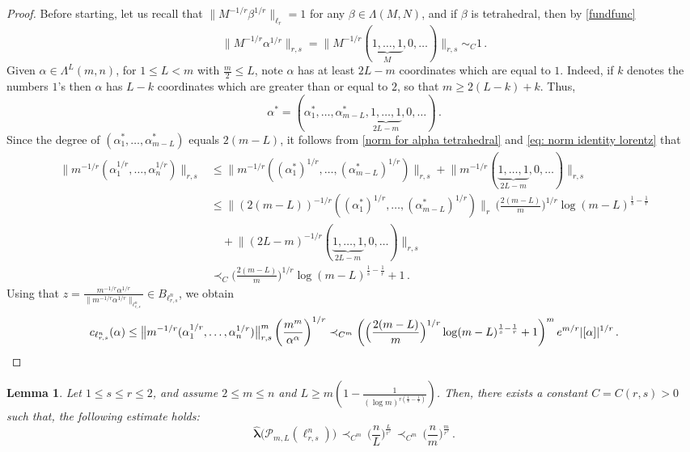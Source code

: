 \documentclass[12pt]{amsart}
\numberwithin{subsection}{section}
\newtheorem{lemma}[theorem]{Lemma}
\theoremstyle{definition}
\theoremstyle{remark}
\begin{document}
\begin{proof}
Before starting, let us recall that $\|M^{-1/r}\beta^{1/r}\|_{\ell_r}=1$ for any $\beta\in\Lambda(M,N)$, and if $\beta$
is tetrahedral, then by \eqref{fundfunc}
\begin{equation}\label{norm for alpha tetrahedral}
\big\|M^{-1/r}\alpha^{1/r}\big\|_{r,s} = \big\|M^{-1/r}(\underbrace{1,\dots,1}_{M},0,\dots)\big\|_{r,s}\sim_C 1\,.
\end{equation}
Given $\alpha  \in \Lambda^{L}(m,n)$, for $1 \le L < m$ with $\frac{m}{2} \leq L$, note $\alpha$ has at least $2L-m$ coordinates which are equal to $1$. Indeed, if  $k$ denotes the numbers  $1$'s then $\alpha$ has $L-k$ coordinates which are greater than or equal to $2$, so that $m\ge  2(L-k)+k$. Thus,
\[
\alpha^*=(\alpha_1^*,\dots,\alpha_{m-L}^*,\underbrace{1,\dots,1}_{2L-m},0,\dots)\,.
\]
Since the degree of $(\alpha_1^*,\dots,\alpha_{m-L}^*)$
equals $2(m-L)$, it follows from \eqref{norm for alpha tetrahedral} and \eqref{eq: norm identity lorentz} that
\begin{align*}
\nonumber \big\|m^{-1/r}(\alpha_1^{1/r},\dots,\alpha_n^{1/r})\big\|_{r,s} &\le  \big\|m^{-1/r}((\alpha_1^*)^{1/r},\dots,(\alpha_{m-L}^*)^{1/r})\big\|_{r,s}+
\big\|m^{-1/r}(\underbrace{1,\dots,1}_{2L-m},0,\dots)\big\|_{r,s}\\
\nonumber
&\le \big\|(2(m-L))^{-1/r}((\alpha_1^*)^{1/r},\dots,(\alpha_{m-L}^*)^{1/r})\big\|_{r} \, \Big(\frac{2(m-L)}{m}\Big)^{1/r}\log(m-L)^{\frac1{s}-\frac1{r}}
\\
&
\quad +\big\|(2L-m)^{-1/r}(\underbrace{1,\dots,1}_{2L-m},0,\dots)\big\|_{r,s} \nonumber \\
&\prec_C \Big(\frac{2(m-L)}{m}\Big)^{1/r}\log(m-L)^{\frac1{s}-\frac1{r}}+1\,.
\end{align*}
Using that  $z = \frac{m^{-1/r}\alpha^{1/r}}{\| m^{-1/r}\alpha^{1/r} \|_{\ell_{r,s}^n}} \in B_{\ell_{r,s}^n}$, we obtain
\begin{equation*}\label{eq: bound for coord fun}
c_{\ell_{r,s}^n}(\alpha)  \le {\big\|m^{-1/r}(\alpha_1^{1/r},\dots,\alpha_n^{1/r})\big\|_{r,s}^{m}}
\left( \frac{m^{m}}{\alpha^\alpha} \right)^{1/r}
 \prec_{C^m} \left( \Big(\frac{2(m-L)}{m}\Big)^{1/r}\log(m-L)^{\frac1{s}-\frac1{r}}+1 \right)^m e^{m/r} |[\alpha]|^{1/r}\,.
 \qedhere
\end{equation*}
\end{proof}

\smallskip

\begin{lemma}\label{lem: bound for big L}
Let $1 \leq s \leq r \leq 2$, and assume $2\le m\le n$  and $L\ge  m\left(1-\frac{1}{(\log m)^{r(\frac1{s}-\frac1{r})}}\right)$.
Then, there exists a constant $C=C(r,s)>0$ such that, the following estimate holds{\rm:}
\begin{equation*}%
\widehat{\boldsymbol{\lambda}}\big(\mathcal P_{m,L}(\ell_{r,s}^n)\big)
\, \prec_{C^m} \,  \Big(\frac{n}{L}\Big)^{\frac{L}{r'}} \, \prec_{C^m} \, \Big(\frac{n}{m}\Big)^{\frac{m}{r'}}\,.
\end{equation*}
\end{lemma}
\end{document}
